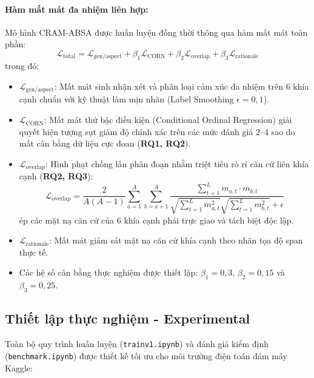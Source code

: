 \documentclass[pdflatex,sn-mathphys-num]{sn-jnl}
\theoremstyle{thmstyleone}
\theoremstyle{thmstyletwo}
\theoremstyle{thmstylethree}
\begin{document}
\paragraph{Hàm mất mát đa nhiệm liên hợp:}
Mô hình CRAM-ABSA được huấn luyện đồng thời thông qua hàm mất mát toàn phần:
\begin{equation}
    \label{eq:total_loss}
    \mathcal{L}_{\text{total}} = \mathcal{L}_{\text{gen/aspect}} + \beta_1 \mathcal{L}_{\text{CORN}} + \beta_2 \mathcal{L}_{\text{overlap}} + \beta_3 \mathcal{L}_{\text{rationale}}
\end{equation}
trong đó:
\begin{itemize}
    \item $\mathcal{L}_{\text{gen/aspect}}$: Mất mát sinh nhận xét và phân loại cảm xúc đa nhiệm trên 6 khía cạnh chuẩn với kỹ thuật làm mịn nhãn (Label Smoothing $\epsilon = 0{,}1$).
    \item $\mathcal{L}_{\text{CORN}}$: Mất mát thứ bậc điều kiện (Conditional Ordinal Regression) giải quyết hiện tượng sụt giảm độ chính xác trên các mức đánh giá 2--4 sao do mất cân bằng dữ liệu cực đoan (\textbf{RQ1, RQ2}).
    \item $\mathcal{L}_{\text{overlap}}$: Hình phạt chồng lấn phân đoạn nhằm triệt tiêu rò rỉ căn cứ liên khía cạnh (\textbf{RQ2, RQ3}):
    \begin{equation}
        \mathcal{L}_{\text{overlap}} = \frac{2}{A(A-1)} \sum_{a=1}^{A} \sum_{b=a+1}^{A} \frac{\sum_{t=1}^{L} m_{a,t} \cdot m_{b,t}}{\sqrt{\sum_{t=1}^{L} m_{a,t}^2} \sqrt{\sum_{t=1}^{L} m_{b,t}^2} + \epsilon}
    \end{equation}
    ép các mặt nạ căn cứ của 6 khía cạnh phải trực giao và tách biệt độc lập.
    \item $\mathcal{L}_{\text{rationale}}$: Mất mát giám sát mặt nạ căn cứ khía cạnh theo nhãn tọa độ span thực tế.
    \item Các hệ số cân bằng thực nghiệm được thiết lập: $\beta_1 = 0{,}3$, $\beta_2 = 0{,}15$ và $\beta_3 = 0{,}25$.
\end{itemize}

\subsection{Thiết lập thực nghiệm - Experimental}
\label{subsec:experimental}

Toàn bộ quy trình huấn luyện (\texttt{trainv1.ipynb}) và đánh giá kiểm định (\texttt{benchmark.ipynb}) được thiết kế tối ưu cho môi trường điện toán đám mây Kaggle:
\end{document}
